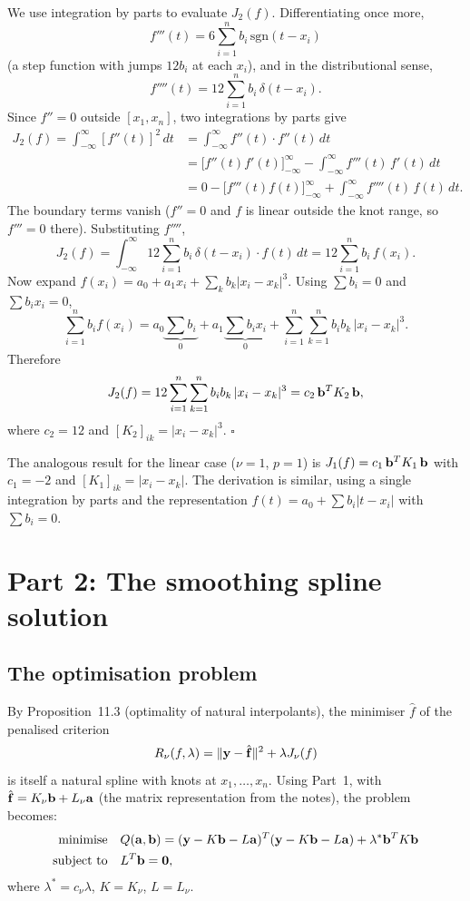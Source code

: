 We use integration by parts to evaluate $J_2(f)$.  Differentiating
once more,
\[
  f'''(t) = 6\sum_{i=1}^n b_i\,\mathrm{sgn}(t-x_i)
\]
(a step function with jumps $12 b_i$ at each $x_i$), and in the
distributional sense,
\[
  f''''(t) = 12\sum_{i=1}^n b_i\,\delta(t-x_i).
\]
Since $f'' = 0$ outside $[x_1,x_n]$, two integrations by parts give
\begin{align*}
  J_2(f) = \int_{-\infty}^{\infty} [f''(t)]^2\,dt
  &= \int_{-\infty}^{\infty} f''(t)\cdot f''(t)\,dt \\
  &= \bigl[f''(t) f'(t)\bigr]_{-\infty}^{\infty}
     - \int_{-\infty}^{\infty} f'''(t)\,f'(t)\,dt \\
  &= 0 - \bigl[f'''(t) f(t)\bigr]_{-\infty}^{\infty}
     + \int_{-\infty}^{\infty} f''''(t)\,f(t)\,dt.
\end{align*}
The boundary terms vanish ($f''=0$ and $f$ is linear outside the knot
range, so $f'''=0$ there).  Substituting $f''''$,
\[
  J_2(f) = \int_{-\infty}^{\infty} 12\sum_{i=1}^n b_i\,\delta(t-x_i)\cdot f(t)\,dt
  = 12\sum_{i=1}^n b_i\,f(x_i).
\]
Now expand $f(x_i) = a_0 + a_1 x_i + \sum_k b_k |x_i-x_k|^3$.
Using $\sum b_i = 0$ and $\sum b_i x_i = 0$,
\[
  \sum_{i=1}^n b_i f(x_i)
  = a_0\underbrace{\sum b_i}_{0}
  + a_1\underbrace{\sum b_i x_i}_{0}
  + \sum_{i=1}^n\sum_{k=1}^n b_i b_k\,|x_i-x_k|^3.
\]
Therefore
\[
  J_2(f) = 12\sum_{i=1}^n\sum_{k=1}^n b_i b_k\,|x_i-x_k|^3
  = c_2\,\mathbf{b}^T K_2\,\mathbf{b},
\]
where $c_2 = 12$ and $[K_2]_{ik} = |x_i-x_k|^3$. \hfill$\square$

\begin{remark}
  The analogous result for the linear case ($\nu=1$, $p=1$) is
  $J_1(f) = c_1\,\mathbf{b}^T K_1\,\mathbf{b}$ with $c_1=-2$ and
  $[K_1]_{ik}=|x_i-x_k|$.  The derivation is similar, using a single
  integration by parts and the representation $f(t)=a_0+\sum b_i|t-x_i|$
  with $\sum b_i = 0$.
\end{remark}

\section*{Part 2: The smoothing spline solution}

\subsection*{The optimisation problem}

By Proposition~11.3 (optimality of natural interpolants), the minimiser
$\hat f$ of the penalised criterion
\[
  R_\nu(f,\lambda) = \|\mathbf{y} - \hat{\mathbf{f}}\|^2 + \lambda J_\nu(f)
\]
is itself a natural spline with knots at $x_1,\dots,x_n$.
Using Part~1, with $\hat{\mathbf{f}} = K_\nu\mathbf{b} + L_\nu\mathbf{a}$ (the
matrix representation from the notes), the problem becomes:
\begin{align}
  \text{minimise} \quad
  &Q(\mathbf{a},\mathbf{b}) = (\mathbf{y} - K\mathbf{b} - L\mathbf{a})^T(\mathbf{y} - K\mathbf{b} - L\mathbf{a})
    + \lambda^* \mathbf{b}^T K\mathbf{b} \label{eq:obj}\\
  \text{subject to} \quad
  &L^T\mathbf{b} = \mathbf{0}, \label{eq:con}
\end{align}
where $\lambda^* = c_\nu\lambda$, $K = K_\nu$, $L = L_\nu$.

